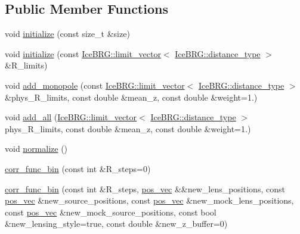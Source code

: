 \subsection*{Public Member Functions}
\begin{DoxyCompactItemize}
\item 
void \hyperlink{structcorr__func__bin_a8ee2dfe994831ccd565d2afaf6559d1c}{initialize} (const size\-\_\-t \&size)
\item 
void \hyperlink{structcorr__func__bin_acee1fef21f10e33c8ca6c374982eb313}{initialize} (const \hyperlink{classIceBRG_1_1limit__vector}{Ice\-B\-R\-G\-::limit\-\_\-vector}$<$ \hyperlink{namespaceIceBRG_a45499647eb87e24c10ab32c628711cec}{Ice\-B\-R\-G\-::distance\-\_\-type} $>$ \&R\-\_\-limits)
\item 
void \hyperlink{structcorr__func__bin_a1f64500034d0f8e227cf1e96c2bfed14}{add\-\_\-monopole} (const \hyperlink{classIceBRG_1_1limit__vector}{Ice\-B\-R\-G\-::limit\-\_\-vector}$<$ \hyperlink{namespaceIceBRG_a45499647eb87e24c10ab32c628711cec}{Ice\-B\-R\-G\-::distance\-\_\-type} $>$ \&phys\-\_\-\-R\-\_\-limits, const double \&mean\-\_\-z, const double \&weight=1.)
\item 
void \hyperlink{structcorr__func__bin_a888e1a946ff971f9ccf60a7d7e3aa2af}{add\-\_\-all} (\hyperlink{classIceBRG_1_1limit__vector}{Ice\-B\-R\-G\-::limit\-\_\-vector}$<$ \hyperlink{namespaceIceBRG_a45499647eb87e24c10ab32c628711cec}{Ice\-B\-R\-G\-::distance\-\_\-type} $>$ phys\-\_\-\-R\-\_\-limits, const double \&mean\-\_\-z, const double \&weight=1.)
\item 
void \hyperlink{structcorr__func__bin_a4d7626836ca9329d179520ca72d6af0d}{normalize} ()
\item 
\hyperlink{structcorr__func__bin_a32ec71e0d9ae366bc3b103260e662567}{corr\-\_\-func\-\_\-bin} (const int \&R\-\_\-steps=0)
\item 
\hyperlink{structcorr__func__bin_adc153b1daa54da93bdb3a47c8d1873ea}{corr\-\_\-func\-\_\-bin} (const int \&R\-\_\-steps, \hyperlink{structcorr__func__bin_a683c7075740b3dcae9ebb1ac758c0bfa}{pos\-\_\-vec} \&\&new\-\_\-lens\-\_\-positions, const \hyperlink{structcorr__func__bin_a683c7075740b3dcae9ebb1ac758c0bfa}{pos\-\_\-vec} \&new\-\_\-source\-\_\-positions, const \hyperlink{structcorr__func__bin_a683c7075740b3dcae9ebb1ac758c0bfa}{pos\-\_\-vec} \&new\-\_\-mock\-\_\-lens\-\_\-positions, const \hyperlink{structcorr__func__bin_a683c7075740b3dcae9ebb1ac758c0bfa}{pos\-\_\-vec} \&new\-\_\-mock\-\_\-source\-\_\-positions, const bool \&new\-\_\-lensing\-\_\-style=true, const double \&new\-\_\-z\-\_\-buffer=0)

\end{DoxyCompactItemize}
